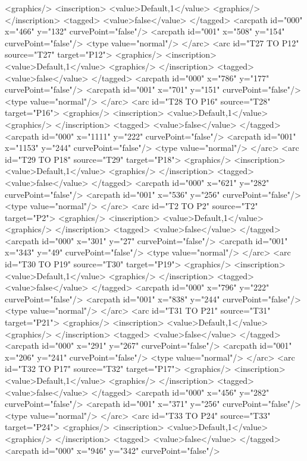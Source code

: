 <graphics/>
<inscription>
<value>Default,1</value>
<graphics/>
</inscription>
<tagged>
<value>false</value>
</tagged>
<arcpath id="000" x="466" y="132" curvePoint="false"/>
<arcpath id="001" x="508" y="154" curvePoint="false"/>
<type value="normal"/>
</arc>
<arc id="T27 TO P12" source="T27" target="P12">
<graphics/>
<inscription>
<value>Default,1</value>
<graphics/>
</inscription>
<tagged>
<value>false</value>
</tagged>
<arcpath id="000" x="786" y="177" curvePoint="false"/>
<arcpath id="001" x="701" y="151" curvePoint="false"/>
<type value="normal"/>
</arc>
<arc id="T28 TO P16" source="T28" target="P16">
<graphics/>
<inscription>
<value>Default,1</value>
<graphics/>
</inscription>
<tagged>
<value>false</value>
</tagged>
<arcpath id="000" x="1111" y="222" curvePoint="false"/>
<arcpath id="001" x="1153" y="244" curvePoint="false"/>
<type value="normal"/>
</arc>
<arc id="T29 TO P18" source="T29" target="P18">
<graphics/>
<inscription>
<value>Default,1</value>
<graphics/>
</inscription>
<tagged>
<value>false</value>
</tagged>
<arcpath id="000" x="621" y="282" curvePoint="false"/>
<arcpath id="001" x="536" y="256" curvePoint="false"/>
<type value="normal"/>
</arc>
<arc id="T2 TO P2" source="T2" target="P2">
<graphics/>
<inscription>
<value>Default,1</value>
<graphics/>
</inscription>
<tagged>
<value>false</value>
</tagged>
<arcpath id="000" x="301" y="27" curvePoint="false"/>
<arcpath id="001" x="343" y="49" curvePoint="false"/>
<type value="normal"/>
</arc>
<arc id="T30 TO P19" source="T30" target="P19">
<graphics/>
<inscription>
<value>Default,1</value>
<graphics/>
</inscription>
<tagged>
<value>false</value>
</tagged>
<arcpath id="000" x="796" y="222" curvePoint="false"/>
<arcpath id="001" x="838" y="244" curvePoint="false"/>
<type value="normal"/>
</arc>
<arc id="T31 TO P21" source="T31" target="P21">
<graphics/>
<inscription>
<value>Default,1</value>
<graphics/>
</inscription>
<tagged>
<value>false</value>
</tagged>
<arcpath id="000" x="291" y="267" curvePoint="false"/>
<arcpath id="001" x="206" y="241" curvePoint="false"/>
<type value="normal"/>
</arc>
<arc id="T32 TO P17" source="T32" target="P17">
<graphics/>
<inscription>
<value>Default,1</value>
<graphics/>
</inscription>
<tagged>
<value>false</value>
</tagged>
<arcpath id="000" x="456" y="282" curvePoint="false"/>
<arcpath id="001" x="371" y="256" curvePoint="false"/>
<type value="normal"/>
</arc>
<arc id="T33 TO P24" source="T33" target="P24">
<graphics/>
<inscription>
<value>Default,1</value>
<graphics/>
</inscription>
<tagged>
<value>false</value>
</tagged>
<arcpath id="000" x="946" y="342" curvePoint="false"/>
